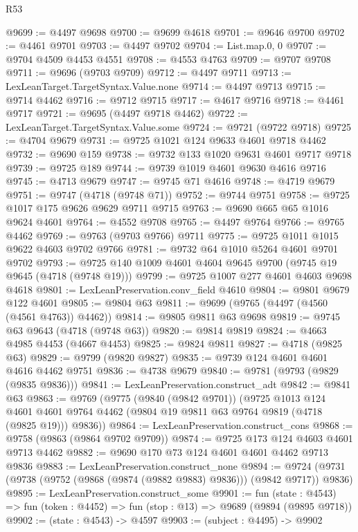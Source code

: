 \begin{lexlean}{R53}
\begin{coremodule}
@9699 := @4497 @9698
@9700 := @9699 @4618
@9701 := @9646 @9700
@9702 := @4461 @9701
@9703 := @4497 @9702
@9704 := List.map.{0, 0}
@9707 := @9704 @4509 @4453 @4551
@9708 := @4553 @4763
@9709 := @9707 @9708
@9711 := @9696 (@9703 @9709)
@9712 := @4497 @9711
@9713 := LexLeanTarget.TargetSyntax.Value.none
@9714 := @4497 @9713
@9715 := @9714 @4462
@9716 := @9712 @9715
@9717 := @4617 @9716
@9718 := @4461 @9717
@9721 := @9695 (@4497 @9718 @4462)
@9722 := LexLeanTarget.TargetSyntax.Value.some
@9724 := @9721 (@9722 @9718)
@9725 := @4704 @9679
@9731 := @9725 @1021 @124 @9633 @4601 @9718 @4462
@9732 := @9690 @159
@9738 := @9732 @133 @1020 @9631 @4601 @9717 @9718
@9739 := @9725 @189
@9744 := @9739 @1019 @4601 @9630 @4616 @9716
@9745 := @4713 @9679
@9747 := @9745 @71 @4616
@9748 := @4719 @9679
@9751 := @9747 (@4718 (@9748 @71))
@9752 := @9744 @9751
@9758 := @9725 @1017 @175 @9626 @9629 @9711 @9715
@9763 := @9690 @665 @65 @1016 @9624 @4601
@9764 := @4552 @9708
@9765 := @4497 @9764
@9766 := @9765 @4462
@9769 := @9763 (@9703 @9766) @9711
@9775 := @9725 @1011 @1015 @9622 @4603 @9702 @9766
@9781 := @9732 @64 @1010 @5264 @4601 @9701 @9702
@9793 := @9725 @140 @1009 @4601 @4604 @9645 @9700 (@9745 @19 @9645 (@4718 (@9748 @19)))
@9799 := @9725 @1007 @277 @4601 @4603 @9698 @4618
@9801 := LexLeanPreservation.conv_field @4610
@9804 := @9801 @9679 @122 @4601
@9805 := @9804 @63
@9811 := @9699 (@9765 (@4497 (@4560 (@4561 @4763)) @4462))
@9814 := @9805 @9811 @63 @9698
@9819 := @9745 @63 @9643 (@4718 (@9748 @63))
@9820 := @9814 @9819
@9824 := @4663 @4985 @4453 (@4667 @4453)
@9825 := @9824 @9811
@9827 := @4718 (@9825 @63)
@9829 := @9799 (@9820 @9827)
@9835 := @9739 @124 @4601 @4601 @4616 @4462 @9751
@9836 := @4738 @9679
@9840 := @9781 (@9793 (@9829 (@9835 @9836)))
@9841 := LexLeanPreservation.construct_adt
@9842 := @9841 @63
@9863 := @9769
    (@9775
      (@9840 (@9842 @9701))
      (@9725
        @1013
        @124
        @4601
        @4601
        @9764
        @4462
        (@9804 @19 @9811 @63 @9764 @9819 (@4718 (@9825 @19)))
        @9836))
@9864 := LexLeanPreservation.construct_cons
@9868 := @9758 (@9863 (@9864 @9702 @9709))
@9874 := @9725 @173 @124 @4603 @4601 @9713 @4462
@9882 := @9690 @170 @73 @124 @4601 @4601 @4462 @9713 @9836
@9883 := LexLeanPreservation.construct_none
@9894 := @9724 (@9731 (@9738 (@9752 (@9868 (@9874 (@9882 @9883) @9836))) (@9842 @9717)) @9836)
@9895 := LexLeanPreservation.construct_some
@9901 := fun (state : @4543) =>
  fun (token : @4452) => fun (stop : @13) => @9689 (@9894 (@9895 @9718))
@9902 := (state : @4543) -> @4597
@9903 := (subject : @4495) -> @9902

\end{coremodule}
\end{lexlean}
